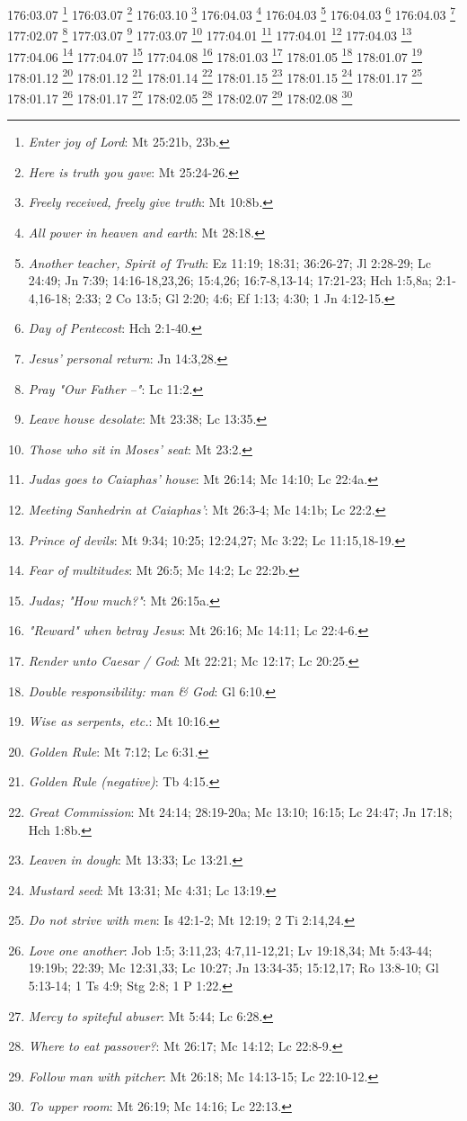176:03.07 \footnote{\textit{Enter joy of Lord}: Mt 25:21b, 23b.}
176:03.07 \footnote{\textit{Here is truth you gave}: Mt 25:24-26.}
176:03.10 \footnote{\textit{Freely received, freely give truth}: Mt 10:8b.}
176:04.03 \footnote{\textit{All power in heaven and earth}: Mt 28:18.}
176:04.03 \footnote{\textit{Another teacher, Spirit of Truth}: Ez 11:19; 18:31; 36:26-27; Jl 2:28-29; Lc 24:49; Jn 7:39; 14:16-18,23,26; 15:4,26; 16:7-8,13-14; 17:21-23; Hch 1:5,8a; 2:1-4,16-18; 2:33; 2 Co 13:5; Gl 2:20; 4:6; Ef 1:13; 4:30; 1 Jn 4:12-15.}
176:04.03 \footnote{\textit{Day of Pentecost}: Hch 2:1-40.}
176:04.03 \footnote{\textit{Jesus' personal return}: Jn 14:3,28.}
177:02.07 \footnote{\textit{Pray "Our Father --"}: Lc 11:2.}
177:03.07 \footnote{\textit{Leave house desolate}: Mt 23:38; Lc 13:35.}
177:03.07 \footnote{\textit{Those who sit in Moses' seat}: Mt 23:2.}
177:04.01 \footnote{\textit{Judas goes to Caiaphas' house}: Mt 26:14; Mc 14:10; Lc 22:4a.}
177:04.01 \footnote{\textit{Meeting Sanhedrin at Caiaphas'}: Mt 26:3-4; Mc 14:1b; Lc 22:2.}
177:04.03 \footnote{\textit{Prince of devils}: Mt 9:34; 10:25; 12:24,27; Mc 3:22; Lc 11:15,18-19.}
177:04.06 \footnote{\textit{Fear of multitudes}: Mt 26:5; Mc 14:2; Lc 22:2b.}
177:04.07 \footnote{\textit{Judas; "How much?"}: Mt 26:15a.}
177:04.08 \footnote{\textit{"Reward" when betray Jesus}: Mt 26:16; Mc 14:11; Lc 22:4-6.}
178:01.03 \footnote{\textit{Render unto Caesar / God}: Mt 22:21; Mc 12:17; Lc 20:25.}
178:01.05 \footnote{\textit{Double responsibility: man & God}: Gl 6:10.}
178:01.07 \footnote{\textit{Wise as serpents, etc.}: Mt 10:16.}
178:01.12 \footnote{\textit{Golden Rule}: Mt 7:12; Lc 6:31.}
178:01.12 \footnote{\textit{Golden Rule (negative)}: Tb 4:15.}
178:01.14 \footnote{\textit{Great Commission}: Mt 24:14; 28:19-20a; Mc 13:10; 16:15; Lc 24:47; Jn 17:18; Hch 1:8b.}
178:01.15 \footnote{\textit{Leaven in dough}: Mt 13:33; Lc 13:21.}
178:01.15 \footnote{\textit{Mustard seed}: Mt 13:31; Mc 4:31; Lc 13:19.}
178:01.17 \footnote{\textit{Do not strive with men}: Is 42:1-2; Mt 12:19; 2 Ti 2:14,24.}
178:01.17 \footnote{\textit{Love one another}: Job 1:5; 3:11,23; 4:7,11-12,21; Lv 19:18,34; Mt 5:43-44; 19:19b; 22:39; Mc 12:31,33; Lc 10:27; Jn 13:34-35; 15:12,17; Ro 13:8-10; Gl 5:13-14; 1 Ts 4:9; Stg 2:8; 1 P 1:22.}
178:01.17 \footnote{\textit{Mercy to spiteful abuser}: Mt 5:44; Lc 6:28.}
178:02.05 \footnote{\textit{Where to eat passover?}: Mt 26:17; Mc 14:12; Lc 22:8-9.}
178:02.07 \footnote{\textit{Follow man with pitcher}: Mt 26:18; Mc 14:13-15; Lc 22:10-12.}
178:02.08 \footnote{\textit{To upper room}: Mt 26:19; Mc 14:16; Lc 22:13.}
